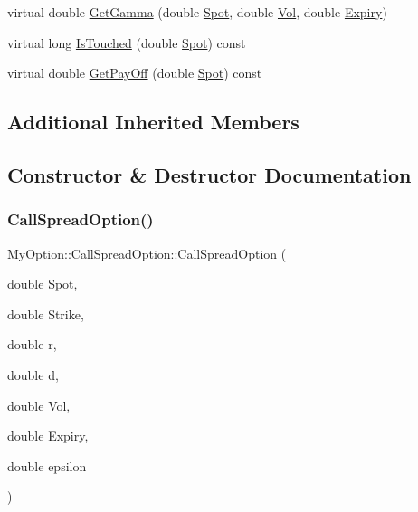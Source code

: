 \begin{DoxyCompactItemize}
\item 
virtual double \hyperlink{classMyOption_1_1CallSpreadOption_ac8dd9fdb03603013350d611e6931a314}{Get\+Gamma} (double \hyperlink{classMyOption_1_1Option_a6c6f01d75cde7e92d16a6d8d6f331a1d}{Spot}, double \hyperlink{classMyOption_1_1Option_a5d6002c14b335c782873bf1437113513}{Vol}, double \hyperlink{classMyOption_1_1Option_ac1adacb417fede41d151b9cda05bcb3d}{Expiry})
\item 
virtual long \hyperlink{classMyOption_1_1CallSpreadOption_a83f8cda1ab9e49df49f8d08d0bab23c7}{Is\+Touched} (double \hyperlink{classMyOption_1_1Option_a6c6f01d75cde7e92d16a6d8d6f331a1d}{Spot}) const
\item 
virtual double \hyperlink{classMyOption_1_1CallSpreadOption_a2e45ec109e4fd26acc6506caa1952c0c}{Get\+Pay\+Off} (double \hyperlink{classMyOption_1_1Option_a6c6f01d75cde7e92d16a6d8d6f331a1d}{Spot}) const
\end{DoxyCompactItemize}
\subsection*{Additional Inherited Members}


\subsection{Constructor \& Destructor Documentation}
\hypertarget{classMyOption_1_1CallSpreadOption_a5d9a2c5d587451e30c49aed0f48f4dc4}{}\label{classMyOption_1_1CallSpreadOption_a5d9a2c5d587451e30c49aed0f48f4dc4} 
\subsubsection{\texorpdfstring{Call\+Spread\+Option()}{CallSpreadOption()}}
{\footnotesize\ttfamily My\+Option\+::\+Call\+Spread\+Option\+::\+Call\+Spread\+Option (\begin{DoxyParamCaption}\item[{double}]{Spot,  }\item[{double}]{Strike,  }\item[{double}]{r,  }\item[{double}]{d,  }\item[{double}]{Vol,  }\item[{double}]{Expiry,  }\item[{double}]{epsilon }\end{DoxyParamCaption})}

